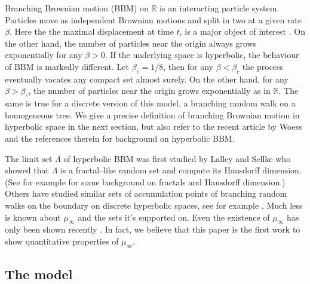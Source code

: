 \documentclass{article}
\theoremstyle{definition}
\numberwithin{equation}{section}
\numberwithin{thm}{section}
\newcommand*{\RR}{\ensuremath{\mathbb{R}}}	        	%
\begin{document}
 Branching Brownian motion (BBM) on $\RR$ is an interacting particle system. Particles move as independent Brownian motions and split in two at a given rate $\beta$. 
 Here the the maximal displacement at time $t$, is a major object of interest \cite{AidBerBruShi2013, Bra1978}. 
 On the other hand, the number of particles near the origin always grows exponentially for any $\beta>0$. 
If the underlying space is hyperbolic, the behaviour of BBM is markedly different. {Let} $\beta_c=1/8$, then for any
 $\beta<\beta_c$ the process eventually vacates any compact set almost surely. On the other hand, for any $\beta>\beta_c$, the number of particles near the origin grows exponentially {as in $\RR$}. The same is true for a discrete version of this model, a branching random walk on a homogeneous tree. We give a precise definition of branching Brownian motion in hyperbolic space in the next section, but {also} refer to the recent article by Woess \cite{woess_notes_2024} and the references therein for background on hyperbolic BBM. 

 The limit set $\Lambda$ of hyperbolic BBM {was} first studied by Lalley and Sellke \cite{lalley_hyperbolic_1997} who show{ed} that $\Lambda$ is a fractal--like random set and compute its Hausdorff dimension. (See for example \cite{falconer_fractal_2014} for some background on fractals and Hausdorff dimension.) Others have studied similar sets of accumulation points of branching random walks on the boundary on discrete hyperbolic spaces, see for example \cite{dussaule_branching_2025, hueter_anisotropic_2000,sidoravicius_limit_2023}. Much less is known about $\mu_\infty$ and the sets it's supported on. Even the existence of $\mu_\infty$ has only been shown recently \cite{candellero_boundary_2023, kaimanovich_limit_2023}. In fact,  we {believe} that this paper is the first {work} to show quantitative properties of $\mu_\infty$.

 
\subsection{The model}
\end{document}
